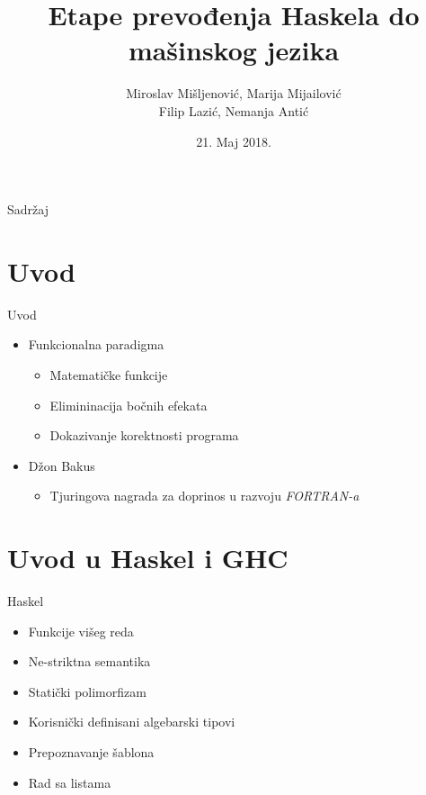 \documentclass{beamer}
\title[Kompilacija funkcionalnih jezika]{Etape prevođenja Haskela do mašinskog jezika}
\author[]{Miroslav Mišljenović, Marija Mijailović\\Filip Lazić, Nemanja Antić}
\institute{Matematički fakultet, Beograd}
\date{21. Maj 2018.}
\begin{document}
\begin{frame}
  \titlepage
\end{frame}

\begin{frame}{Sadržaj}
  \tableofcontents
\end{frame}

\section{Uvod}

\begin{frame}{Uvod}
	\begin{itemize}
  		\item Funkcionalna paradigma 
	  		\begin{itemize}
	  			\item Matematičke funkcije
	  			\item Elimininacija bočnih efekata
	  			\item Dokazivanje korektnosti programa
	  		\end{itemize}
  		\vspace{0.5cm}
  		\item Džon Bakus
	  		\begin{itemize}
	  			\item Tjuringova nagrada za doprinos u razvoju \textit{FORTRAN-a}
	  		\end{itemize}
  	\end{itemize}
\end{frame}

\section{Uvod u Haskel i GHC}
\begin{frame}{Haskel}
	\begin{itemize}
 	  	\item Funkcije višeg reda
  		\item Ne-striktna semantika
  		\item Statički polimorfizam
  		\item Korisnički definisani algebarski tipovi
  		\item Prepoznavanje šablona 
  		\item Rad sa listama
  	\end{itemize}
\end{frame}
\end{document}
